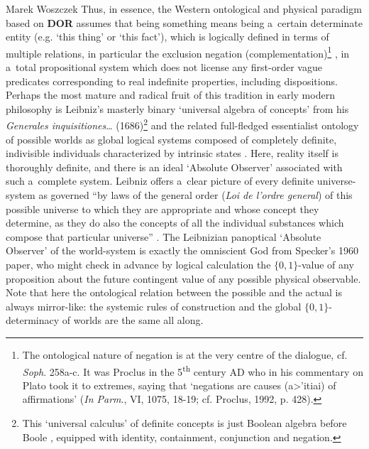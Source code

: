 \begin{artengenv}{Marek Woszczek}
Thus, in essence, the Western ontological and physical paradigm based on \textbf{DOR} assumes that being something means being a~certain determinate entity (e.g. ‘this thing' or ‘this fact'), which is logically defined in terms of multiple relations, in particular the exclusion negation (complementation)\footnote{The ontological nature of negation is at the very centre of the dialogue, cf. \textit{Soph}. 258a-c. It was Proclus in the 5\textsuperscript{th} century AD who in his commentary on Plato took it to extremes, saying that ‘negations are causes (\textgreek{a>'itiai}) of affirmations' (\textit{In Parm}., VI, 1075, 18-19; cf. Proclus, 1992, p. 428).} , in a~total propositional system which does not license any first-order vague predicates corresponding to real indefinite properties, including dispositions. Perhaps the most mature and radical fruit of this tradition in early modern philosophy is Leibniz's masterly binary ‘universal algebra of concepts' from his \textit{Generales inquisitiones}… (1686)\footnote{This ‘universal calculus' of definite concepts is just Boolean algebra before Boole
\parencites[][]{lenzen_leibniz_1984}[][]{malink_logic_2016}, %
 equipped with identity, containment, conjunction and negation.} and the related full-fledged essentialist ontology of possible worlds as global logical systems composed of completely definite, indivisible individuals characterized by intrinsic states 
\parencite[see e.g.][]{bella_science_2005}. %
 Here, reality itself is thoroughly definite, and there is an ideal ‘Absolute Observer' associated with such a~complete system. Leibniz offers a~clear picture of every definite universe-system as governed “by laws of the general order (\textit{Loi de l'ordre general}) of this possible universe to which they are appropriate and whose concept they determine, as they do also the concepts of all the individual substances which compose that particular universe'' 
\parencite[Leibniz in a~letter to A. Arnauld, 14 July 1686][p.73]{leibniz_samtliche_2009}. %
 The Leibnizian panoptical ‘Absolute Observer' of the world-system is exactly the omniscient God from Specker's 1960 paper, who might check in advance by logical calculation the $\{0,1\}${}-value of any proposition about the future contingent value of any possible physical observable. Note that here the ontological relation between the possible and the actual is always mirror-like: the systemic rules of construction and the global $\{0,1\}${}-determinacy of worlds are the same all along.


\end{artengenv}
